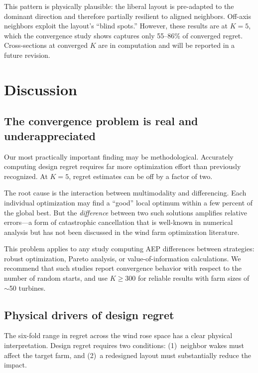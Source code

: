 \documentclass[manuscript, 12pt]{copernicus}
\begin{document}
This pattern is physically plausible: the liberal layout is pre-adapted to the dominant direction and therefore partially resilient to aligned neighbors.
Off-axis neighbors exploit the layout's ``blind spots.''
However, these results are at $K = 5$, which the convergence study shows captures only 55--86\% of converged regret.
Cross-sections at converged $K$ are in computation and will be reported in a future revision.

\section{Discussion}\label{sec:discussion}

\subsection{The convergence problem is real and underappreciated}

Our most practically important finding may be methodological.
Accurately computing design regret requires far more optimization effort than previously recognized.
At $K = 5$, regret estimates can be off by a factor of two.

The root cause is the interaction between multimodality and differencing.
Each individual optimization may find a ``good'' local optimum within a few percent of the global best.
But the \emph{difference} between two such solutions amplifies relative errors---a form of catastrophic cancellation that is well-known in numerical analysis but has not been discussed in the wind farm optimization literature.

This problem applies to any study computing AEP differences between strategies: robust optimization, Pareto analysis, or value-of-information calculations.
We recommend that such studies report convergence behavior with respect to the number of random starts, and use $K \geq 300$ for reliable results with farm sizes of $\sim$50 turbines.

\subsection{Physical drivers of design regret}

The six-fold range in regret across the wind rose space has a clear physical interpretation.
Design regret requires two conditions: (1)~neighbor wakes must affect the target farm, and (2)~a redesigned layout must substantially reduce the impact.
\end{document}
